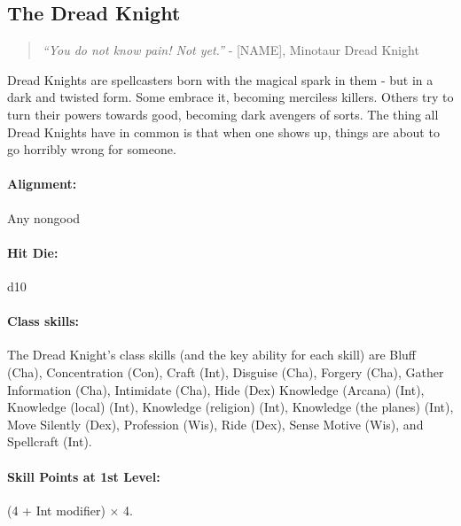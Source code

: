 \subsection[Dread Knight]{The Dread Knight}
\begin{quote}
\emph{``You do not know pain! Not yet.''}
- [NAME], Minotaur Dread Knight
\end{quote}

Dread Knights are spellcasters born with the magical spark in them - but in a dark and twisted form. Some embrace it, becoming merciless killers.
Others try to turn their powers towards good, becoming dark avengers of sorts.
The thing all Dread Knights have in common is that when one shows up, things are about to go horribly wrong for someone.
\paragraph{Alignment:} Any nongood
\paragraph{Hit Die:} d10
\paragraph{Class skills:}
The Dread Knight's class skills (and the key ability for each skill) are Bluff (Cha), Concentration (Con), Craft (Int), Disguise (Cha), Forgery (Cha), Gather Information (Cha), Intimidate (Cha), Hide (Dex) Knowledge (Arcana) (Int), Knowledge (local) (Int), Knowledge (religion) (Int), Knowledge (the planes) (Int), Move Silently (Dex), Profession (Wis), Ride (Dex), Sense Motive (Wis), and Spellcraft (Int).

\paragraph{Skill Points at 1st Level:} (4 + Int modifier) $\times$ 4.
